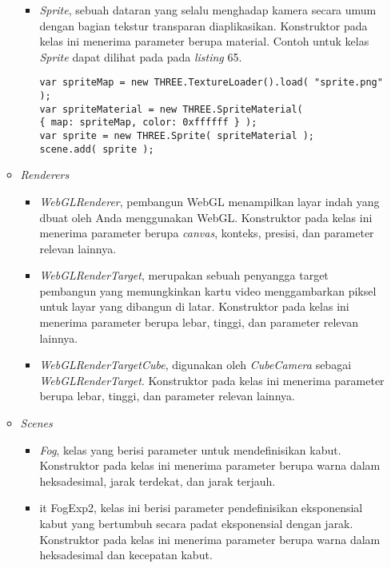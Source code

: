 \documentclass[a4paper,twoside]{article}
\begin{document}
\begin{enumerate}
\begin{itemize}
\begin{itemize}
	\item {\it Sprite}, sebuah dataran yang selalu menghadap kamera secara umum dengan bagian tekstur transparan diaplikasikan. Konstruktor pada kelas ini menerima parameter berupa material. Contoh untuk kelas {\it Sprite} dapat dilihat pada pada {\it listing} 65.
	
\begin{lstlisting}[caption={Contoh penggunaan kelas {\it Sprite}.},captionpos=b]
var spriteMap = new THREE.TextureLoader().load( "sprite.png" );
var spriteMaterial = new THREE.SpriteMaterial( 
{ map: spriteMap, color: 0xffffff } );
var sprite = new THREE.Sprite( spriteMaterial );
scene.add( sprite );
\end{lstlisting}
	
	\end{itemize}

\item \textit{Renderers}
	\begin{itemize}
	\item {\it WebGLRenderer}, pembangun WebGL menampilkan layar indah yang dbuat oleh Anda menggunakan WebGL. Konstruktor pada kelas ini menerima parameter berupa {\it canvas}, konteks, presisi, dan parameter relevan lainnya.
	
	\item {\it WebGLRenderTarget}, merupakan sebuah penyangga target pembangun yang memungkinkan kartu video menggambarkan piksel untuk layar yang dibangun di latar. Konstruktor pada kelas ini menerima parameter berupa lebar, tinggi, dan parameter relevan lainnya.
	
	\item {\it WebGLRenderTargetCube}, digunakan oleh {\it CubeCamera} sebagai {\it WebGLRenderTarget}. Konstruktor pada kelas ini menerima parameter berupa lebar, tinggi, dan parameter relevan lainnya.
	\end{itemize}
		
\item \textit{Scenes}

	\begin{itemize}
	\item {\it Fog}, kelas yang berisi parameter untuk mendefinisikan kabut. Konstruktor pada kelas ini menerima parameter berupa warna dalam heksadesimal, jarak terdekat, dan jarak terjauh.
	
	\item {it FogExp2}, kelas ini berisi parameter pendefinisikan eksponensial kabut yang bertumbuh secara padat eksponensial dengan jarak. Konstruktor pada kelas ini menerima parameter berupa warna dalam heksadesimal dan kecepatan kabut.
	

\end{itemize}
\end{itemize}
\end{enumerate}
\end{document}
